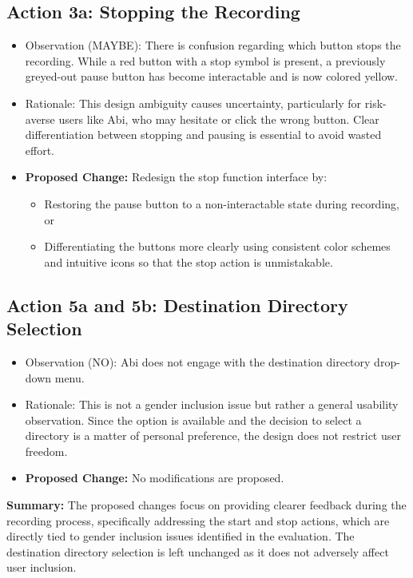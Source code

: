 \documentclass[12pt, titlepage]{article}
\begin{document}
\subsection{Action 3a: Stopping the Recording}
\begin{itemize}
  \item Observation (MAYBE): There is confusion regarding which button stops the recording. While a red button with a 
  stop symbol is present, a previously greyed-out pause button has become interactable and is now colored yellow.
  \item Rationale: This design ambiguity causes uncertainty, particularly for risk-averse users like Abi, 
  who may hesitate or click the wrong button. Clear differentiation between stopping and pausing is essential to 
  avoid wasted effort.
  \item \textbf{Proposed Change:} Redesign the stop function interface by:
  \begin{itemize}
    \item Restoring the pause button to a non-interactable state during recording, or
    \item Differentiating the buttons more clearly using consistent color schemes and intuitive icons so that 
    the stop action is unmistakable.
  \end{itemize}
\end{itemize}

\subsection{Action 5a and 5b: Destination Directory Selection}
\begin{itemize}
  \item Observation (NO): Abi does not engage with the destination directory drop-down menu.
  \item Rationale: This is not a gender inclusion issue but rather a general usability observation. 
  Since the option is available and the decision to select a directory is a matter of personal preference, 
  the design does not restrict user freedom.
  \item \textbf{Proposed Change:} No modifications are proposed.
\end{itemize}

\noindent
\textbf{Summary:} The proposed changes focus on providing clearer feedback during the recording process, 
specifically addressing the start and stop actions, which are directly tied to gender inclusion issues 
identified in the evaluation. The destination directory selection is left unchanged as it does not adversely 
affect user inclusion.
\end{document}
